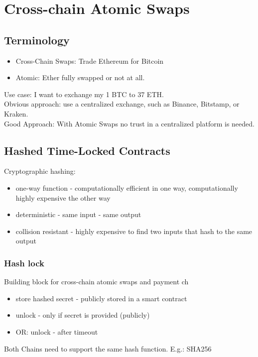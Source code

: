 \section{Cross-chain Atomic Swaps}
\subsection{Terminology}
\begin{itemize}
  \item Cross-Chain Swaps: Trade Ethereum for Bitcoin
  \item Atomic: Ether fully swapped or not at all. 
\end{itemize}
Use case: I want to exchange my 1 BTC to 37 ETH.\\
Obvious approach: use a centralized exchange, such as Binance, Bitstamp, or Kraken.\\
Good Approach: With Atomic Swaps no trust in a centralized platform is needed.

\subsection{Hashed Time-Locked Contracts}
Cryptographic hashing:
\begin{itemize}
  \item one-way function - computationally efficient in one way, computationally highly expensive the other way
  \item deterministic - same input - same output
  \item collision resistant - highly expensive to find two inputs that hash to the same output
\end{itemize}
\subsubsection{Hash lock}
Building block for cross-chain atomic swaps and payment ch
\begin{itemize}
  \item store hashed secret - publicly stored in a smart contract
  \item unlock - only if secret is provided (publicly)
  \item OR: unlock - after timeout
\end{itemize}
Both Chains need to support the same hash function. E.g.: SHA256

